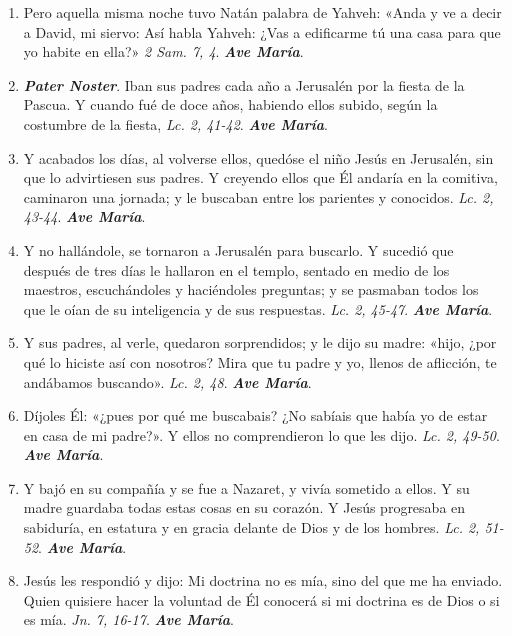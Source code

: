 \documentclass[11pt,a4paper]{book}
\begin{document}
    \begin{enumerate}
        \item Pero aquella misma noche tuvo Natán palabra de Yahveh: «Anda y ve a decir a David, mi siervo: Así habla Yahveh: ¿Vas a edificarme tú una casa
            para que yo habite en ella?» \emph{2 Sam. 7, 4}. \textbf{\emph{Ave María}}.

        \item \textbf{\emph{Pater Noster}}. Iban sus padres cada año a Jerusalén por la fiesta de la Pascua. 
            Y cuando fué de doce años, habiendo ellos subido, según la costumbre de la fiesta, \emph{Lc. 2, 41-42}. \textbf{\emph{Ave María}}.

        \item Y acabados los días, al volverse ellos, quedóse el niño Jesús en Jerusalén, sin que lo advirtiesen sus padres. 
            Y creyendo ellos que Él andaría en la comitiva, caminaron una jornada; y le buscaban entre los parientes y conocidos. 
            \emph{Lc. 2, 43-44}. \textbf{\emph{Ave María}}.

        \item Y no hallándole, se tornaron a Jerusalén para buscarlo. Y sucedió que después de tres días le hallaron en el templo, 
            sentado en medio de los maestros, escuchándoles y haciéndoles preguntas; y se pasmaban todos los que le oían de su inteligencia 
            y de sus respuestas. \emph{Lc. 2, 45-47}. \textbf{\emph{Ave María}}.

        \item Y sus padres, al verle, quedaron sorprendidos; y le dijo su madre: «hijo, ¿por qué lo hiciste así con nosotros? 
            Mira que tu padre y yo, llenos de aflicción, te andábamos buscando». \emph{Lc. 2, 48}. \textbf{\emph{Ave María}}.

        \item Díjoles Él: «¿pues por qué me buscabais? ¿No sabíais que había yo de estar en casa de mi padre?». Y ellos no comprendieron lo que les dijo. 
            \emph{Lc. 2, 49-50}. \textbf{\emph{Ave María}}.

        \item Y bajó en su compañía y se fue a Nazaret, y vivía sometido a ellos. Y su madre guardaba todas estas cosas en su corazón. 
            Y Jesús progresaba en sabiduría, en estatura y en gracia delante de Dios y de los hombres. \emph{Lc. 2, 51-52}. \textbf{\emph{Ave María}}.

        \item Jesús les respondió y dijo: Mi doctrina no es mía, sino del que me ha enviado. Quien quisiere hacer la voluntad de Él conocerá si mi doctrina
            es de Dios o si es mía. \emph{Jn. 7, 16-17}. \textbf{\emph{Ave María}}.


\end{enumerate}
\end{document}
